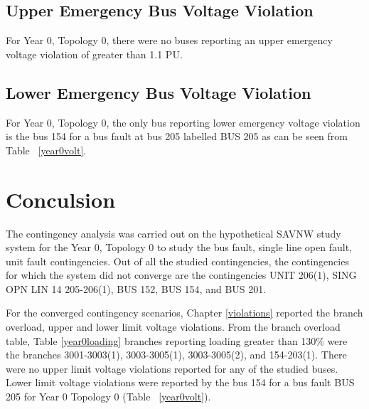 \documentclass{report}
\begin{document}
\section{Upper Emergency Bus Voltage Violation}

For Year 0, Topology 0, there were no buses reporting an upper emergency voltage violation of greater than 1.1 PU. 


\section{Lower Emergency Bus Voltage Violation}

For Year 0, Topology 0, the only bus reporting lower emergency voltage violation is the bus 154 for a bus fault at bus 205 labelled BUS 205 as can be seen from Table ~\ref{year0volt}.

\begin{table}[H]
\caption{Lower Emergency Voltage Violations Year 0 Topology 0}
\label{year0volt}
\centering
{}
\end{table}

\chapter{Conculsion}
\label{conclusion} 

The contingency analysis was carried out on the hypothetical SAVNW study system for the Year 0, Topology 0 to study the bus fault, single line open fault, unit fault contingencies. Out of all the studied contingencies, the contingencies for which the system did not converge are the contingencies UNIT 206(1), SING OPN LIN   14 205-206(1), BUS 152, BUS 154, and BUS 201.

For the converged contingency scenarios, Chapter \ref{violations} reported the branch overload, upper and lower limit voltage violations. From the branch overload table, Table \ref{year0loading} branches reporting loading greater than 130\% were the branches 3001-3003(1), 3003-3005(1), 3003-3005(2), and 154-203(1). There were no upper limit voltage violations reported for any of the studied buses. Lower limit voltage violations were reported by the bus 154 for a bus fault BUS 205 for Year 0 Topology 0 (Table ~\ref{year0volt}). 
\end{document}
